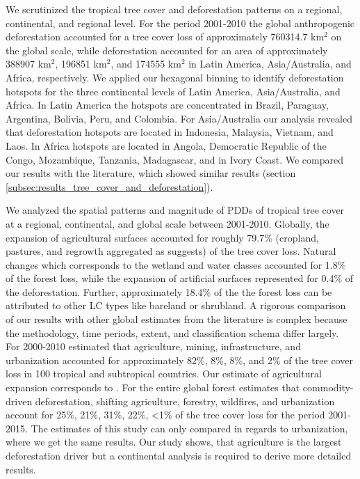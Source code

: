 		We scrutinized the tropical tree cover and deforestation patterns on a regional, continental, and regional level. For the period 2001-2010 the global anthropogenic deforestation accounted for a tree cover loss of approximately 760314.7 km$^2$ on the global scale, while deforestation accounted for an area of approximately 388907 km$^2$, 196851 km$^2$, and 174555 km$^2$ in Latin America, Asia/Australia, and Africa, respectively. We applied our hexagonal binning to identify deforestation hotspots for the three continental levels of Latin America, Asia/Australia, and Africa. In Latin America the hotspots are concentrated in Brazil, Paraguay, Argentina, Bolivia, Peru, and Colombia. For Asia/Australia our analysis revealed that deforestation hotspots are located in Indonesia, Malaysia, Vietnam, and Laos. In Africa hotspots are located in Angola, Democratic Republic of the Congo, Mozambique, Tanzania, Madagascar, and in Ivory Coast. We compared our results with the literature, which showed similar results (section \ref{subsec:results_tree_cover_and_deforestation}).

		We analyzed the spatial patterns and magnitude of \acp{PDD} of tropical tree cover at a regional, continental, and global scale between 2001-2010. Globally, the expansion of agricultural surfaces accounted for roughly 79.7\% (cropland, pastures, and regrowth aggregated as \citet{Geist2001} suggests) of the tree cover loss. Natural changes which corresponds to the wetland and water classes accounted for 1.8\% of the forest loss, while the expansion of artificial surfaces represented for 0.4\% of the deforestation. Further, approximately 18.4\% of the the forest loss can be attributed to other \ac{LC} types like bareland or shrubland. A rigorous comparison of our results with other global estimates from the literature is complex because the methodology, time periods, extent, and classification schema differ largely. For 2000-2010 \citet{Hosonuma2012} estimated that agriculture, mining, infrastructure, and urbanization accounted for approximately 82\%, 8\%, 8\%, and 2\% of the tree cover loss in 100 tropical and subtropical countries. Our estimate of agricultural expansion corresponds to \citet{Hosonuma2012}. For the entire global forest \citet{Curtis2018} estimates that commodity-driven deforestation, shifting agriculture, forestry, wildfires, and urbanization account for 25\%, 21\%, 31\%, 22\%, <1\% of the tree cover loss for the period 2001-2015. The estimates of this study can only compared in regards to urbanization, where we get the same results. Our study shows, that agriculture is the largest deforestation driver but a continental analysis is required to derive more detailed results. 

